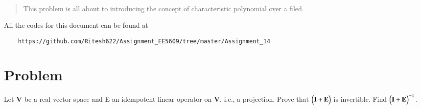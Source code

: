 \documentclass[journal,12pt,twocolumn]{IEEEtran}
\begin{document}
	
	\maketitle
	\newpage
	\bigskip
	\renewcommand{\thefigure}{\theenumi}
	\renewcommand{\thetable}{\theenumi}
	\date{Today}
	
	
	\begin{abstract}
		This problem is all about to  introducing the concept of characteristic polynomial over a filed.
	\end{abstract}
	All the codes for this document can be found at
	\begin{lstlisting}
	https://github.com/Ritesh622/Assignment_EE5609/tree/master/Assignment_14
	\end{lstlisting}
	\section{Problem}
	Let $\mathbf{V}$ be a real vector space and E an idempotent linear operator on $\mathbf{V}$, i.e., a projection. Prove that $\begin{pmatrix}\mathbf{I} + \mathbf{E}\end{pmatrix}$ is
	invertible. Find $\begin{pmatrix}\mathbf{I} + \mathbf{E}\end{pmatrix}^{-1}.$
	
\end{document}
